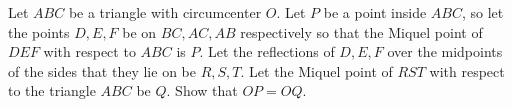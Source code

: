 Let $ABC$ be a triangle with circumcenter $O$. Let $P$ be a point inside $ABC$, so let the points $D, E, F$ be on $BC, AC, AB$ respectively so that the Miquel point of $DEF$ with respect to $ABC$ is $P$. Let the reflections of $D, E, F$ over the midpoints of the sides that they lie on be $R, S, T$. Let the Miquel point of $RST$ with respect to the triangle $ABC$ be $Q$. Show that $OP = OQ$.

